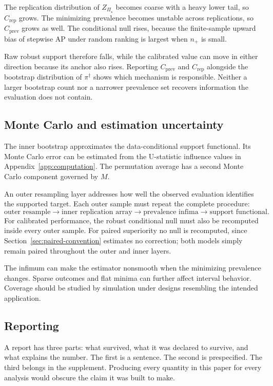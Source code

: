 \documentclass[11pt]{article}
\newcommand{\PSet}{\Pi_\star}
\theoremstyle{remark}
\begin{document}
The replication distribution of $Z_{\PSet}$ becomes coarse with a heavy lower tail, so $C_{\mathrm{rep}}$ grows. The minimizing prevalence becomes unstable across replications, so $C_{\mathrm{prev}}$ grows as well. The conditional null rises, because the finite-sample upward bias of stepwise AP under random ranking is largest when $n_+$ is small.

Raw robust support therefore falls, while the calibrated value can move in either direction because its anchor also rises. Reporting $C_{\mathrm{prev}}$ and $C_{\mathrm{rep}}$ alongside the bootstrap distribution of $\pi^\dagger$ shows which mechanism is responsible. Neither a larger bootstrap count nor a narrower prevalence set recovers information the evaluation does not contain.

\subsection{Monte Carlo and estimation uncertainty}

The inner bootstrap approximates the data-conditional support functional. Its Monte Carlo error can be estimated from the U-statistic influence values in Appendix~\ref{app:computation}. The permutation average has a second Monte Carlo component governed by $M$.

An outer resampling layer addresses how well the observed evaluation identifies the supported target. Each outer sample must repeat the complete procedure:
\[
\text{outer resample}
\longrightarrow
\text{inner replication array}
\longrightarrow
\text{prevalence infima}
\longrightarrow
\text{support functional}.
\]
For calibrated performance, the robust conditional null must also be recomputed inside every outer sample. For paired superiority no null is recomputed, since Section~\ref{sec:paired-convention} estimates no correction; both models simply remain paired throughout the outer and inner layers.

The infimum can make the estimator nonsmooth when the minimizing prevalence changes. Sparse outcomes and flat minima can further affect interval behavior. Coverage should be studied by simulation under designs resembling the intended application.

\subsection{Reporting}

A report has three parts: what survived, what it was declared to survive, and what explains the number. The first is a sentence. The second is prespecified. The third belongs in the supplement. Producing every quantity in this paper for every analysis would obscure the claim it was built to make.
\end{document}
